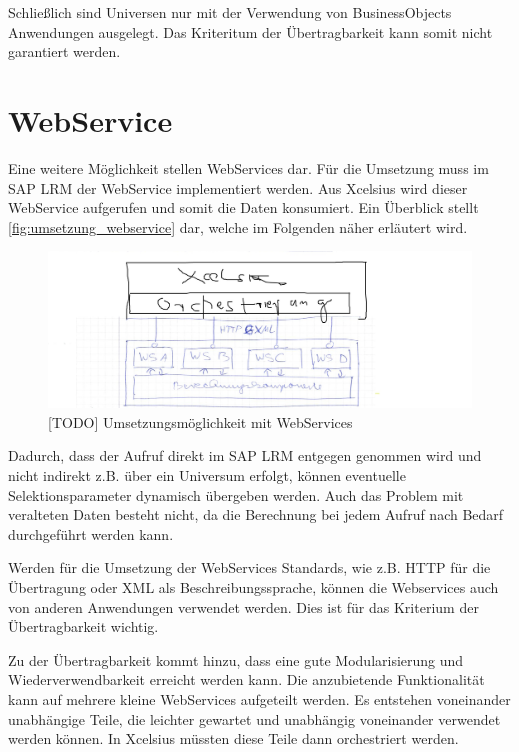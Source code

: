 Schließlich sind Universen nur mit der Verwendung von BusinessObjects Anwendungen ausgelegt. Das Kriteritum der Übertragbarkeit kann somit nicht garantiert werden.

\section{WebService}
Eine weitere Möglichkeit stellen WebServices dar. Für die Umsetzung muss im SAP LRM der WebService implementiert werden. Aus Xcelsius wird dieser WebService aufgerufen und somit die Daten konsumiert. Ein Überblick stellt \vref{fig:umsetzung_webservice} dar, welche im Folgenden näher erläutert wird.

\begin{figure}[h]
\centering
\setlength{\unitlength}{1mm}
\includegraphics[width=15cm]{images/umsetzung_webservice.jpg}
\caption{[TODO] Umsetzungsmöglichkeit mit WebServices\label{fig:umsetzung_webservice}}
\end{figure}

Dadurch, dass der Aufruf direkt im SAP LRM entgegen genommen wird und nicht indirekt z.B. über ein Universum erfolgt, können eventuelle Selektionsparameter dynamisch übergeben werden. Auch das Problem mit veralteten Daten besteht nicht, da die Berechnung bei jedem Aufruf nach Bedarf durchgeführt werden kann.

Werden für die Umsetzung der WebServices Standards, wie z.B. HTTP für die Übertragung oder XML als Beschreibungssprache, können die Webservices auch von anderen Anwendungen verwendet werden. Dies ist für das Kriterium der Übertragbarkeit wichtig.

Zu der Übertragbarkeit kommt hinzu, dass eine gute Modularisierung und Wiederverwendbarkeit erreicht werden kann. Die anzubietende Funktionalität kann auf mehrere kleine WebServices aufgeteilt werden. Es entstehen voneinander unabhängige Teile, die leichter gewartet und unabhängig voneinander verwendet werden können. In Xcelsius müssten diese Teile dann orchestriert werden.

